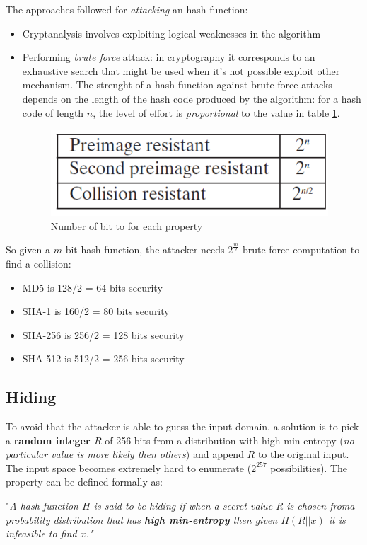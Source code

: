 \documentclass[10pt,a4paper]{report}
\begin{document}
The approaches followed for \textit{attacking} an hash function:
\begin{itemize}
	\item 
	Cryptanalysis involves exploiting logical weaknesses in the algorithm
	\item 
	Performing \textit{brute force} attack: in cryptography it corresponds to an exhaustive search that might be used when it's not possible exploit other mechanism.
	The strenght of a hash function against brute force attacks depends on the length of the hash code produced by the algorithm: for a hash code of length $n$, the level of effort is \textit{proportional} to the value in table \ref{property-bit-value}.
	\begin{figure}[b]
		\centering
		\includegraphics[scale=0.40]{images/Pasted image 20230319110256.png}
		\caption{Number of bit to for each property}
	\label{property-bit-value}	
\end{figure}
	\end{itemize}
	So given a $m$-bit hash function, the attacker needs $2^{\frac{m}{2}}$ brute force computation to find a collision:
\begin{itemize}
	\item 
	MD5 is 128/2 = 64 bits security
	\item 
	SHA-1 is 160/2 = 80 bits security
	\item 
	SHA-256 is 256/2 = 128 bits security
	\item 
	SHA-512 is 512/2 = 256 bits security
\end{itemize}
\subsection{Hiding}\label{sec:hiding}
To avoid that the attacker is able to guess the input domain, a solution is to pick a \textbf{random integer $R$} of 256 bits from a distribution with high min entropy (\textit{no particular value is more likely then others}) and append $R$ to the original input. The input space becomes extremely hard to enumerate ($2^{257}$ possibilities).
The property can be defined formally as:
\begin{center}
	"\textit{A hash function $H$ is said to be hiding if when a secret value R is chosen froma probability distribution that has \textbf{high min-entropy}  then given $H(R || x)$ it is infeasible to find $x$."}
\end{center}
\end{document}
